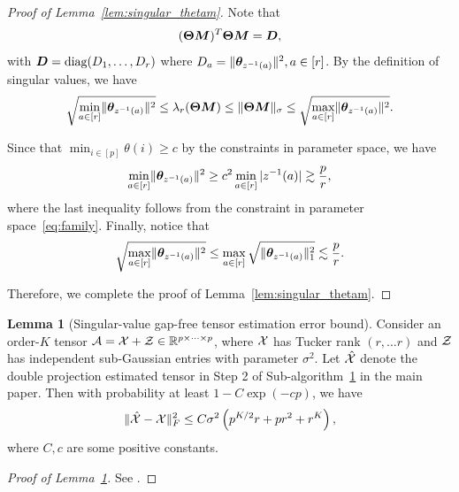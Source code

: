 \documentclass[journal]{IEEEtran}
\theoremstyle{definition}
\newtheorem{lem}{Lemma}
\theoremstyle{definition}
\newcommand{\of}[1]{\left(#1\right)}
\begin{document}
\begin{proof}[Proof of Lemma~\ref{lem:singular_thetam}] Note that 
\begin{equation}
    (\boldsymbol{\Theta}\bm M)^T \boldsymbol{\Theta} \bm M = \bm{D},
\end{equation}
with $\bm{D} = \text{diag}(D_1,\ldots, D_r)$ where $D_a = \lVert\boldsymbol{\theta}_{z^{-1}(a)}\rVert^2, a \in [r]$.
By the definition of singular values, we have 
\begin{equation}
     \sqrt{\min_{a \in [r]}\lVert \boldsymbol{\theta}_{ z^{-1}(a)} \rVert^2 } \leq \lambda_r(\boldsymbol{\Theta} \bm M) \leq \lVert\boldsymbol{\Theta}\bm M\rVert_{\sigma} \leq \sqrt{ \max_{a \in [r]}\lVert \boldsymbol{\theta}_{ z^{-1}(a)} \rVert^2}.
\end{equation}

Since that $\min_{i \in [p]}\theta(i) \geq c$ by the constraints in parameter space, we have  
\begin{equation}
   \min_{a \in [r]} \lVert \boldsymbol{\theta}_{ z^{-1}(a)} \rVert^2 \geq c^2 \min_{a \in [r]} |z^{-1}(a)| \gtrsim \frac{p}{r},
\end{equation}
where the last inequality follows from the constraint in parameter space~\eqref{eq:family}. Finally, notice that 
\begin{equation}
    \sqrt{\max_{a \in [r]}\lVert \boldsymbol{\theta}_{ z^{-1}(a)} \rVert^2 } \leq \max_{a \in [r]} \sqrt{ \lVert \boldsymbol{\theta}_{ z^{-1}(a)} \rVert^2_1} \lesssim \frac{p}{r}.
\end{equation}

 Therefore, we complete the proof of Lemma~\ref{lem:singular_thetam}.
\end{proof}

\begin{lem}[Singular-value gap-free tensor estimation error bound]\label{lem:two-step_esterror}Consider an order-$K$ tensor $\mathcal{A} = \mathcal{X} + \mathcal{Z} \in \mathbb{R}^{p \times \cdots \times p}$, where $\mathcal{X}$ has Tucker rank $(r,...r)$ and $\mathcal{Z}$ has independent sub-Gaussian entries with parameter $\sigma^2$. Let $\hat {\mathcal{X}}$ denote the double projection estimated tensor in Step 2 of Sub-algorithm~\hyperref[alg:main]{1} in the main paper. Then with probability at least $1 - C \exp\of{- cp }$, we have
\begin{align}
    \onormSize{}{\hat \tX - \tX}_F^2 \leq C \sigma^2 \of{ p^{K/2}r + pr^2 + r^K },
\end{align}
where $C, c$ are some positive constants.
\end{lem}

\begin{proof}[Proof of Lemma~\ref{lem:two-step_esterror}]
See \cite[Proposition 1]{han2020exact}.
\end{proof}
\end{document}
